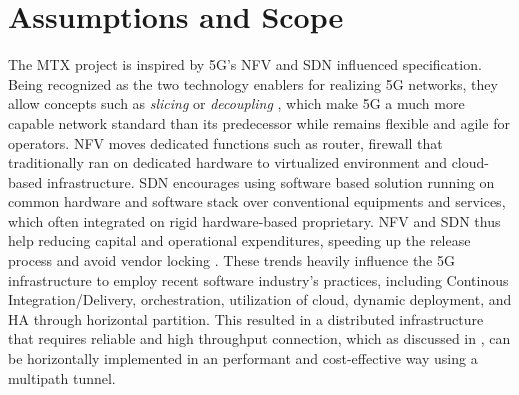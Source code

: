 \section{Assumptions and Scope}
The MTX project is inspired by \ac{5G}'s \ac{NFV} and \ac{SDN} influenced specification.
Being recognized as the two technology enablers for realizing 5G networks, they allow concepts such as \textit{slicing} or \textit{decoupling} \cite{yousaf_nfv_sdn_key_techno_for_5g2017} \cite{open_baton}, which make \ac{5G} a much more capable network standard than its predecessor while remains flexible and agile for operators.
\ac{NFV} moves dedicated functions such as router, firewall that traditionally ran on dedicated hardware to virtualized environment and cloud-based infrastructure.
\ac{SDN} encourages using software based solution running on common hardware and software stack over conventional equipments and services, which often integrated on rigid hardware-based proprietary.
\ac{NFV} and \ac{SDN} thus help reducing capital and operational expenditures, speeding up the release process and avoid vendor locking \cite{sun_integrating_2015}\cite{yousaf_nfv_sdn_key_techno_for_5g2017}.
These trends heavily influence the 5G infrastructure to employ recent software industry's practices, including Continous Integration/Delivery, orchestration, utilization of cloud, dynamic deployment, and \ac{HA} through horizontal partition.
This resulted in a distributed infrastructure that requires reliable and high throughput connection, which as discussed in , can be horizontally implemented in an performant and cost-effective way using a multipath tunnel. 
\\

